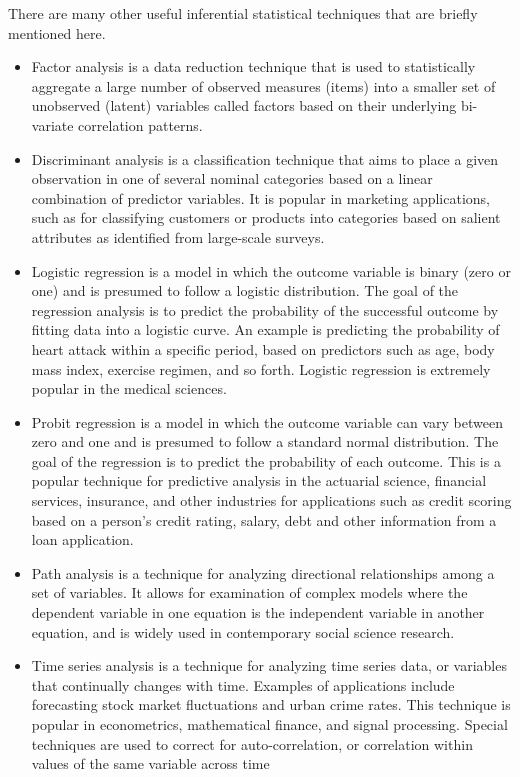 There are many other useful inferential statistical techniques that are briefly mentioned here.

\begin{itemize}
	\item Factor analysis is a data reduction technique that is used to statistically aggregate a large number of observed measures (items) into a smaller set of unobserved (latent) variables called factors based on their underlying bi-variate correlation patterns.
	\item Discriminant analysis is a classification technique that aims to place a given observation in one of several nominal categories based on a linear combination of predictor variables. It is popular in marketing applications, such as for classifying customers or products into categories based on salient attributes as identified from large-scale surveys.
	\item Logistic regression is a model in which the outcome variable is binary (zero or one) and is presumed to follow a logistic distribution. The goal of the regression analysis is to predict the probability of the successful outcome by fitting data into a logistic curve. An example is predicting the probability of heart attack within a specific period, based on predictors such as age, body mass index, exercise regimen, and so forth. Logistic regression is extremely popular in the medical sciences. 
	\item Probit regression is a model in which the outcome variable can vary between zero and one and is presumed to follow a standard normal distribution. The goal of the regression is to predict the probability of each outcome. This is a popular technique for predictive analysis in the actuarial science, financial services, insurance, and other industries for applications such as credit scoring based on a person's credit rating, salary, debt and other information from a loan application.
	\item Path analysis is a technique for analyzing directional relationships among a set of variables. It allows for examination of complex models where the dependent variable in one equation is the independent variable in another equation, and is widely used in contemporary social science research. 
	\item Time series analysis is a technique for analyzing time series data, or variables that continually changes with time. Examples of applications include forecasting stock market fluctuations and urban crime rates. This technique is popular in econometrics, mathematical finance, and signal processing. Special techniques are used to correct for auto-correlation, or correlation within values of the same variable across time 
\end{itemize}


